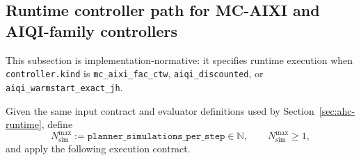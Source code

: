 \documentclass[11pt]{article}
\begin{document}
\subsection{Runtime controller path for MC-AIXI and AIQI-family controllers}\label{sec:aixi-runtime}

This subsection is implementation-normative: it specifies runtime execution
when \texttt{controller.kind} is \texttt{mc\_aixi\_fac\_ctw},
\texttt{aiqi\_discounted}, or
\texttt{aiqi\_warmstart\_exact\allowbreak\_jh}.

Given the same input contract and evaluator definitions used by
Section~\ref{sec:ahc-runtime}, define
\[
N_{\mathrm{sim}}^{\max}:=\texttt{planner\_simulations\_per\_step}\in\mathbb{N},
\qquad N_{\mathrm{sim}}^{\max}\ge 1,
\]
and apply the following execution contract.
\end{document}
